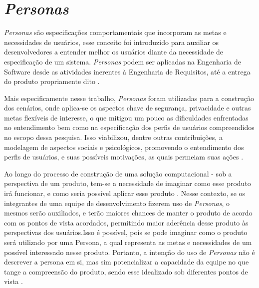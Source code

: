 \section{\textit{Personas}}
\label{sec:personas}

\textit{Personas} são especificações comportamentais que incorporam as metas e necessidades de usuários, esse conceito foi introduzido para auxiliar os desenvolvedores a entender melhor os usuários diante da necessidade de especificação de um sistema. \textit{Personas} podem ser aplicadas na Engenharia de Software desde as atividades inerentes à Engenharia de Requisitos, até a entrega do produto propriamente dito \cite{ford2017characterizing}. 

Mais especificamente nesse trabalho, \textit{Personas} foram utilizadas para a construção dos cenários, onde aplica-se os aspectos chave de segurança, privacidade e outras metas flexíveis de interesse, o que mitigou um pouco as dificuldades enfrentadas no entendimento bem como na especificação dos perfis de usuários compreendidos no escopo dessa pesquisa. Isso viabilizou, dentre outras contribuições, a modelagem de aspectos sociais e psicológicos, promovendo o entendimento dos perfis de usuários, e suas possíveis motivações, as quais permeiam suas ações \cite{ford2017characterizing} \cite{daelaboraccao}. 



Ao longo do processo de construção de uma solução computacional - sob a perspectiva de um produto, tem-se a necessidade de imaginar como esse produto irá funcionar, e como seria possível aplicar esse produto \cite{soegaard2012encyclopedia}. Nesse contexto, se os integrantes de uma equipe de desenvolvimento fizerem uso de \textit{Personas}, o mesmos serão auxiliados, e terão maiores chances de manter o produto de acordo com os pontos de vista acordados, permitindo maior aderência desse produto às perspectivas dos usuários.Isso é possível, pois se pode imaginar como o produto será utilizado por uma Persona, a qual representa as metas e necessidades de um possível interessado nesse produto. Portanto, a intenção do uso de \textit{Personas} não é descrever a persona em si, mas sim potencializar a capacidade da equipe no que tange a compreensão do produto, sendo esse idealizado sob diferentes pontos de vista \cite{soegaard2012encyclopedia}.


